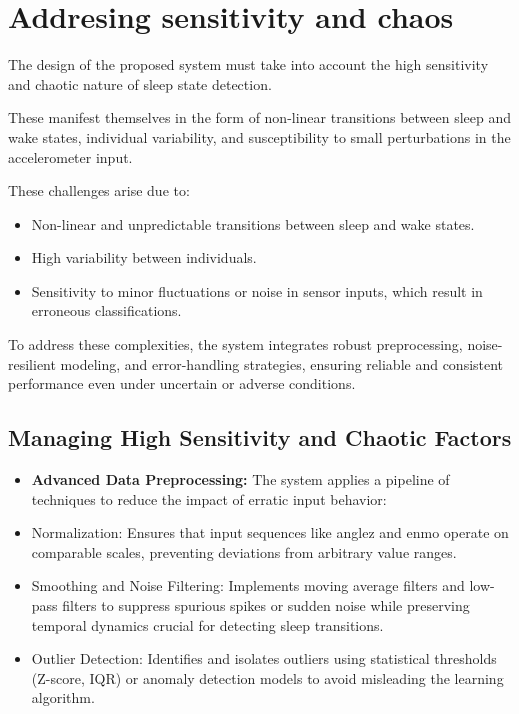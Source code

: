 \documentclass[conference]{IEEEtran}
\begin{document}
\section{Addresing sensitivity and chaos}

The design of the proposed system must take into account the high sensitivity and chaotic nature of sleep state detection.

These manifest themselves in the form of non-linear transitions between sleep and wake states, individual variability, and susceptibility to small perturbations in the accelerometer input.

These challenges arise due to:
\begin{itemize}
\item Non-linear and unpredictable transitions between sleep and wake states.
\item High variability between individuals.
\item Sensitivity to minor fluctuations or noise in sensor inputs, which result in erroneous classifications.
\end{itemize}

To address these complexities, the system integrates robust preprocessing, noise-resilient modeling, and error-handling strategies, ensuring reliable and consistent performance even under uncertain or adverse conditions.

\subsection{Managing High Sensitivity and Chaotic Factors}

\begin{itemize}

\item \textbf{Advanced Data Preprocessing:}
The system applies a pipeline of techniques to reduce the impact of erratic input behavior:
\item Normalization: Ensures that input sequences like anglez and enmo operate on comparable scales, preventing deviations from arbitrary value ranges.
\item Smoothing and Noise Filtering: Implements moving average filters and low-pass filters to suppress spurious spikes or sudden noise while preserving temporal dynamics crucial for detecting sleep transitions.
\item Outlier Detection: Identifies and isolates outliers using statistical thresholds (Z-score, IQR) or anomaly detection models to avoid misleading the learning algorithm.

\end{itemize}
\end{document}
